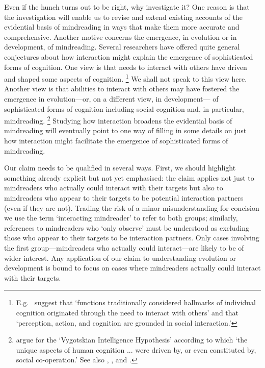 \documentclass[12pt,\papersize]{extarticle}
\begin{document}
Even if the hunch turns out to be right, why investigate it?
One reason is that the investigation will enable us to revise and extend existing accounts of the evidential basis of mindreading  in ways that make them more accurate and comprehensive.
Another motive concerns the emergence, in evolution or in development, of mindreading.
Several researchers have offered quite general conjectures about how interaction might explain the emergence of sophisticated forms of cognition.
One view is that needs to interact with others have driven and shaped some aspects of cognition.%
\footnote{
E.g.\ \citet[p.\ 103]{Knoblich:2006bn} suggest that 
`functions traditionally considered hallmarks of individual cognition originated through the need to interact with others'
and that
`perception, action, and cognition are grounded in social interaction.'
}
We shall not speak to this view here.
Another view is that abilities to interact with others
may have fostered the emergence in evolution---or, on a different view, in development---%
of sophisticated forms of cognition including social cognition and, in particular, mindreading.%
\footnote{
\citet[p.\ 1]{Moll:2007gu}
argue for the `Vygotskian Intelligence Hypothesis' according to which `the unique aspects of human cognition ... were driven by, or even constituted by, social co-operation.'
See also
	\citet{Hughes:2004zj},
	\citet{Hughes:2006fu},
	\citet{Tomasello:2007gl} and
	\citet{tomasello:2008origins}.
}
Studying how interaction broadens the evidential basis of mindreading will eventually point to one way of filling in some details on just how interaction might facilitate the emergence of sophisticated forms of mindreading.

Our claim needs to be qualified in several ways.
First, we should highlight something already explicit but not yet emphasised:
the claim applies not just to 
 mindreaders who actually could interact with their targets
but also to
 mindreaders who appear to their targets to be potential interaction partners (even if they are not).
Trading the risk of a minor misunderstanding for concision we use the term `interacting mindreader' to refer to both groups;
similarly, references to mindreaders who `only observe' must be understood as excluding those who appear to their targets to be interaction partners.
Only cases involving the first group---mindreaders who actually could interact---are likely to be of wider interest.
Any application of our claim to understanding evolution or development is bound to focus on cases where mindreaders actually could interact with their targets.
\end{document}
